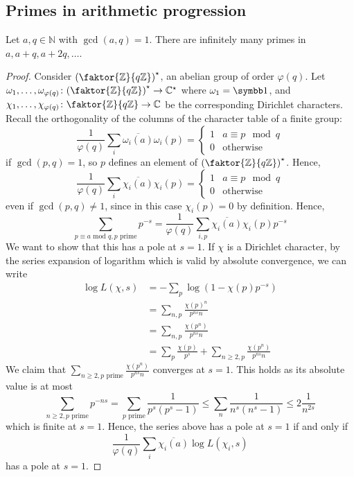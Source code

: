 \subsection{Primes in arithmetic progression}
\begin{theorem}[Dirichlet]
    Let \( a, q \in \mathbb N \) with \( \gcd(a,q) = 1 \).
    There are infinitely many primes in \( a, a + q, a + 2q, \dots \).
\end{theorem}
\begin{proof}
    Consider \( \qty(\faktor{\mathbb Z}{q\mathbb Z})^\star \), an abelian group of order \( \varphi(q) \).
    Let \( \omega_1, \dots, \omega_{\varphi(q)} \colon \qty(\faktor{\mathbb Z}{q\mathbb Z})^\star \to \mathbb C^\star \) where \( \omega_1 = \symbb 1 \), and \( \chi_1, \dots, \chi_{\varphi(q)} \colon \faktor{\mathbb Z}{q\mathbb Z} \to \mathbb C \) be the corresponding Dirichlet characters.
    Recall the orthogonality of the columns of the character table of a finite group:
    \[ \frac{1}{\varphi(q)} \sum_i \overline{\omega_i(a)} \omega_i(p) = \begin{cases}
        1 & a \equiv p \mod q \\
        0 & \text{otherwise}
    \end{cases} \]
    if \( \gcd(p, q) = 1 \), so \( p \) defines an element of \( \qty(\faktor{\mathbb Z}{q\mathbb Z})^\star \).
    Hence,
    \[ \frac{1}{\varphi(q)} \sum_i \overline{\chi_i(a)} \chi_i(p) = \begin{cases}
        1 & a \equiv p \mod q \\
        0 & \text{otherwise}
    \end{cases} \]
    even if \( \gcd(p, q) \neq 1 \), since in this case \( \chi_i(p) = 0 \) by definition.
    Hence,
    \[ \sum_{p \equiv a \text{ mod } q, p \text{ prime}} p^{-s} = \frac{1}{\varphi(q)} \sum_{i, p} \overline{\chi_i(a)} \chi_i(p) p^{-s} \]
    We want to show that this has a pole at \( s = 1 \).
    If \( \chi \) is a Dirichlet character, by the series expansion of logarithm which is valid by absolute convergence, we can write
    \begin{align*}
        \log L(\chi, s) &= -\sum_p \log(1 - \chi(p) p^{-s}) \\
        &= \sum_{n,p} \frac{\chi(p)^n}{p^{ns} n} \\
        &= \sum_{n,p} \frac{\chi(p^n)}{p^{ns} n} \\
        &= \sum_p \frac{\chi(p)}{p^s} + \sum_{n \geq 2, p} \frac{\chi(p^n)}{p^{ns} n}
    \end{align*}
    We claim that \( \sum_{n \geq 2, p \text{ prime}} \frac{\chi(p^n)}{p^{ns} n} \) converges at \( s = 1 \).
    This holds as its absolute value is at most
    \[ \sum_{n \geq 2, p \text{ prime}} p^{-ns} = \sum_{p \text{ prime}} \frac{1}{p^s(p^s - 1)} \leq \sum_n \frac{1}{n^s(n^s - 1)} \leq 2\frac{1}{n^{2s}} \]
    which is finite at \( s = 1 \).
    Hence, the series above has a pole at \( s = 1 \) if and only if
    \[ \frac{1}{\varphi(q)} \sum_{i} \overline{\chi_i(a)} \log L(\chi_i, s) \]
    has a pole at \( s = 1 \).


\end{proof}
